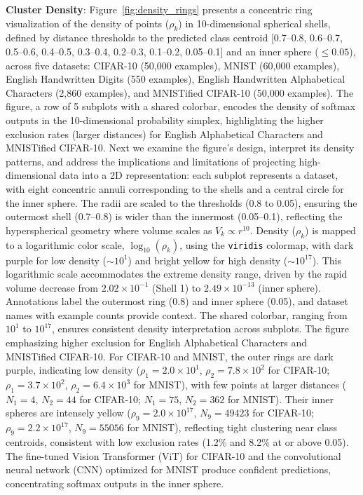 \textbf{Cluster Density}: Figure~\ref{fig:density_rings} presents a concentric ring visualization of the density of points (\(\rho_k\)) in 10-dimensional spherical shells, defined by distance thresholds to the predicted class centroid [0.7--0.8, 0.6--0.7, 0.5--0.6, 0.4--0.5, 0.3--0.4, 0.2--0.3, 0.1--0.2, 0.05--0.1] and an inner sphere (\(\leq 0.05\)), across five datasets: CIFAR-10 (50,000 examples), MNIST (60,000 examples), English Handwritten Digits (550 examples), English Handwritten Alphabetical Characters (2,860 examples), and MNISTified CIFAR-10 (50,000 examples). The figure, a row of 5 subplots with a shared colorbar, encodes the density of softmax outputs in the 10-dimensional probability simplex, highlighting the higher exclusion rates (larger distances) for English Alphabetical Characters and MNISTified CIFAR-10. Next we examine the figure’s design, interpret its density patterns, and address the implications and limitations of projecting high-dimensional data into a 2D representation: each subplot represents a dataset, with eight concentric annuli corresponding to the shells and a central circle for the inner sphere. The radii are scaled to the thresholds (0.8 to 0.05), ensuring the outermost shell (0.7--0.8) is wider than the innermost (0.05--0.1), reflecting the hyperspherical geometry where volume scales as \(V_k \propto r^{10}\). Density (\(\rho_k\)) is mapped to a logarithmic color scale, \(\log_{10}(\rho_k)\), using the \texttt{viridis} colormap, with dark purple for low density (\(\sim 10^1\)) and bright yellow for high density (\(\sim 10^{17}\)). This logarithmic scale accommodates the extreme density range, driven by the rapid volume decrease from \(2.02 \times 10^{-1}\) (Shell 1) to \(2.49 \times 10^{-13}\) (inner sphere). Annotations label the outermost ring (0.8) and inner sphere (0.05), and dataset names with example counts provide context. The shared colorbar, ranging from \(10^1\) to \(10^{17}\), ensures consistent density interpretation across subplots. The figure emphasizing higher exclusion for English Alphabetical Characters and MNISTified CIFAR-10. For CIFAR-10 and MNIST, the outer rings are dark purple, indicating low density (\(\rho_1 = 2.0 \times 10^1\), \(\rho_2 = 7.8 \times 10^2\) for CIFAR-10; \(\rho_1 = 3.7 \times 10^2\), \(\rho_2 = 6.4 \times 10^3\) for MNIST), with few points at larger distances (\(N_1 = 4\), \(N_2 = 44\) for CIFAR-10; \(N_1 = 75\), \(N_2 = 362\) for MNIST). Their inner spheres are intensely yellow (\(\rho_9 = 2.0 \times 10^{17}\), \(N_9 = 49423\) for CIFAR-10; \(\rho_9 = 2.2 \times 10^{17}\), \(N_9 = 55056\) for MNIST), reflecting tight clustering near class centroids, consistent with low exclusion rates (1.2\% and 8.2\% at or above 0.05). The fine-tuned Vision Transformer (ViT) for CIFAR-10 and the convolutional neural network (CNN) optimized for MNIST produce confident predictions, concentrating softmax outputs in the inner sphere.

